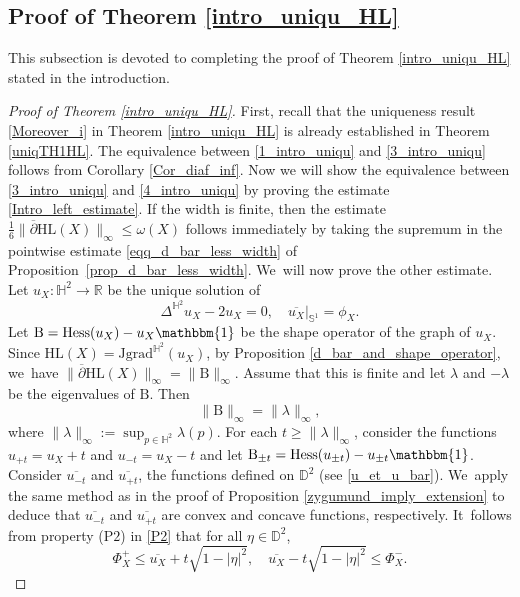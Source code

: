 \documentclass[JEP,XML,SOM,Unicode,NoEqCountersInSection, NoFloatCountersInSection,published]{cedram}
\theoremstyle{plain}
\theoremstyle{definition}
\newcommand{\grad}{\mathrm{grad}^{\mathbb{H}^2}}
\newcommand{\J}{\mathrm{J}}
\newcommand{\B}{\mathrm{B}}
\begin{document}
\subsection{Proof of Theorem \ref{intro_uniqu_HL}}
This subsection is devoted to completing the proof of Theorem \ref{intro_uniqu_HL} stated in the introduction.
\begin{proof}[Proof of Theorem \ref{intro_uniqu_HL}]
First, recall that the uniqueness result \eqref{Moreover_i} in Theorem \ref{intro_uniqu_HL} is already established in Theorem \ref{uniqTH1HL}.
The equivalence between \eqref{1_intro_uniqu} and \eqref{3_intro_uniqu} follows from Corollary \ref{Cor_diaf_inf}. Now we will show the equivalence between \eqref{3_intro_uniqu} and \eqref{4_intro_uniqu} by proving the estimate \eqref{Intro_left_estimate}.
If the width is finite, then the estimate \(\frac{1}{6} \lVert \overline{\partial} \mathrm{HL}(X) \rVert_{\infty} \leq \omega(X)\) follows immediately by taking the supremum in the pointwise estimate \eqref{eqq_d_bar_less_width} of Proposition~\ref{prop_d_bar_less_width}. We~will now prove the other estimate. Let \(u_X:\mathbb{H}^2 \to \mathbb{R}\) be the unique solution of
\begin{equation}\label{platau_HPXX}
\Delta^{\mathbb{H}^2} u_X - 2u_X = 0, \quad
\overline{u_X}|_{\mathbb{S}^1} = \phi_X.
\end{equation}
Let \(\B = \mathrm{Hess}(u_X) - u_X \mathbbm{1}\) be the shape operator of the graph of \(u_X\). Since \(\mathrm{HL}(X) = \J\grad(u_X)\), by Proposition \ref{d_bar_and_shape_operator}, we~have \(\lVert \overline{\partial} \mathrm{HL}(X) \rVert_{\infty} = \lVert \B \rVert_{\infty}\). Assume that this is finite and let \(\lambda\) and \(-\lambda\) be the eigenvalues of $\B$. Then
\[
\lVert \B \rVert_{\infty} = \lVert \lambda \rVert_{\infty},
\]
where \(\lVert \lambda \rVert_{\infty} := \sup_{p \in \mathbb{H}^2} \lambda(p).\)
For each \(t \geq \lVert \lambda \rVert_{\infty} \), consider the functions \(u_{+t} = u_X + t \) and \(u_{-t} = u_X - t \) and let \(\B_{\pm t} = \mathrm{Hess}(u_{\pm t}) - u_{\pm t} \mathbbm{1} \). Consider \(\overline{u_{-t}} \) and \(\overline{u_{+t}} \), the functions defined on \(\mathbb{D}^2\) (see \eqref{u_et_u_bar}). We~apply the same method as in the proof of Proposition \ref{zygumund_imply_extension} to deduce that \(\overline{u_{-t}}\) and \(\overline{u_{+t}}\) are convex and concave functions, respectively. It~follows from property ($\mathrm{P2}$) in \ref{P2} that for all \(\eta \in \mathbb{D}^2 \),
\[
\Phi_X^+ \leq \overline{u_X} + t \sqrt{1 - \lvert \eta \rvert^2}, \quad \overline{u_X} - t \sqrt{1 - \lvert \eta \rvert^2} \leq \Phi_X^-.
\]
\end{proof}
\end{document}
